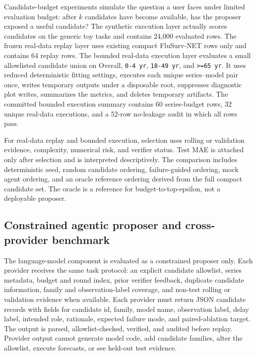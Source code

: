 Candidate-budget experiments simulate the question a user faces under limited
evaluation budget: after $k$ candidates have become available, has the
proposer exposed a useful candidate? The synthetic execution layer actually
scores candidates on the generic toy tasks and contains 24,000 evaluated
rows. The frozen real-data replay layer uses existing compact FluSurv-NET
rows only and contains 64 replay rows. The bounded real-data execution layer
evaluates a small allowlisted candidate union on Overall, \texttt{0-4 yr},
\texttt{18-49 yr}, and \texttt{>=65 yr}. It uses reduced deterministic fitting
settings, executes each unique series--model pair once, writes temporary
outputs under a disposable root, suppresses diagnostic plot writes, summarizes
the metrics, and deletes temporary artifacts. The committed bounded execution
summary contains 60 series-budget rows, 32 unique real-data executions, and a
52-row no-leakage audit in which all rows pass.

For real-data replay and bounded execution, selection uses rolling or
validation evidence, complexity, numerical risk, and verifier status. Test MAE
is attached only after selection and is interpreted descriptively. The
comparison includes deterministic seed, random candidate ordering,
failure-guided ordering, mock agent ordering, and an oracle reference ordering
derived from the full compact candidate set. The oracle is a reference for
budget-to-top-epsilon, not a deployable proposer.

\subsection{Constrained agentic proposer and cross-provider benchmark}

The language-model component is evaluated as a constrained proposer only. Each
provider receives the same task protocol: an explicit candidate allowlist,
series metadata, budget and round index, prior verifier feedback, duplicate
candidate information, family and observation-label coverage, and non-test
rolling or validation evidence when available. Each provider must return JSON
candidate records with fields for candidate id, family, model name,
observation label, delay label, intended role, rationale, expected failure
mode, and paired-ablation target. The output is parsed, allowlist-checked,
verified, and audited before replay. Provider output cannot generate model
code, add candidate families, alter the allowlist, execute forecasts, or see
held-out test evidence.

